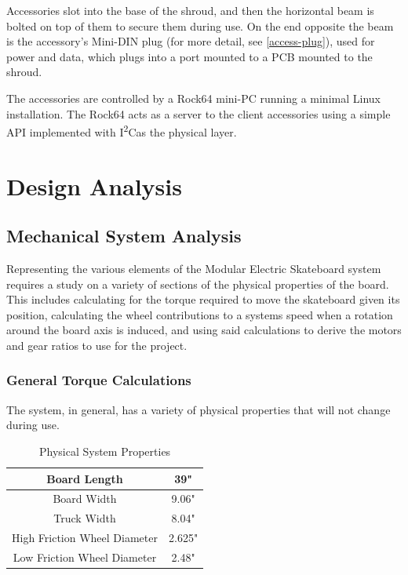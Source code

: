 \documentclass[letterpaper,12pt]{article}
\newcommand{\itwoc}{I\textsuperscript{2}C}
\begin{document}
Accessories slot into the base of the shroud, and then the horizontal beam is bolted on top of them to secure them during use. On the end opposite the beam is the accessory's Mini-DIN plug (for more detail, see \ref{access-plug}), used for power and data, which plugs into a port mounted to a PCB mounted to the shroud.

The accessories are controlled by a Rock64 mini-PC running a minimal Linux installation. The Rock64 acts as a server to the client accessories using a simple API implemented with \itwoc as the physical layer.

\newpage
\section{Design Analysis}

\subsection{Mechanical System Analysis}
Representing the various elements of the Modular Electric Skateboard system requires a study on a variety of sections of the physical properties of the board. This includes calculating for the torque required to move the skateboard given its position, calculating the wheel contributions to a systems speed when a rotation around the board axis is induced, and using said calculations to derive the motors and gear ratios to use for the project.
\subsubsection{General Torque Calculations}
The system, in general, has a variety of physical properties that will not change during use.

\begin{table}[h]
\caption{Physical System Properties}
\begin{center}
 \begin{tabular}{||c c||}
 \hline
 Board Length & 39" \\
 \hline
 Board Width & 9.06" \\
 \hline
 Truck Width & 8.04" \\
 \hline
 High Friction Wheel Diameter & 2.625" \\
 \hline
 Low Friction Wheel Diameter & 2.48" \\
 \hline
\end{tabular}
\end{center}
\label{table:phys}
\end{table}
\end{document}
